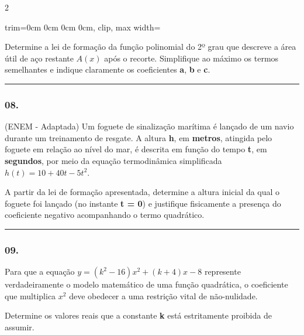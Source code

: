 \documentclass[twoside, 10pt, a4paper]{article}
\newlength{\espacoPreQuestao}
\newlength{\espacoQuestao}
\newlength{\larguraTikz}
\begin{document}
\begin{multicols*}{2}
\begin{center}
\begin{adjustbox}{trim=0cm 0cm 0cm 0cm, clip, max width=\larguraTikz}
\end{adjustbox}
\end{center}

Determine a lei de formação da função polinomial do 2º grau que descreve a área útil de aço restante $A(x)$ após o recorte. Simplifique ao máximo os termos semelhantes e indique claramente os coeficientes \textbf{a}, \textbf{b} e \textbf{c}.
\par\vspace{\espacoQuestao}

\noindent\textcolor{CorLinha}{\rule{\linewidth}{0.5pt}} 
\par\vspace{\espacoPreQuestao}
\subsubsection*{08.} (ENEM - Adaptada) Um foguete de sinalização marítima é lançado de um navio durante um treinamento de resgate. A altura \textbf{h}, em \textbf{metros}, atingida pelo foguete em relação ao nível do mar, é descrita em função do tempo \textbf{t}, em \textbf{segundos}, por meio da equação termodinâmica simplificada $h(t) = 10 + 40t - 5t^2$.

A partir da lei de formação apresentada, determine a altura inicial da qual o foguete foi lançado (no instante \textbf{t = 0}) e justifique fisicamente a presença do coeficiente negativo acompanhando o termo quadrático.
\par\vspace{\espacoQuestao}

\noindent\textcolor{CorLinha}{\rule{\linewidth}{0.5pt}} 
\par\vspace{\espacoPreQuestao}
\subsubsection*{09.} Para que a equação $y = (k^2 - 16)x^2 + (k + 4)x - 8$ represente verdadeiramente o modelo matemático de uma função quadrática, o coeficiente que multiplica $x^2$ deve obedecer a uma restrição vital de não-nulidade. 

Determine os valores reais que a constante \textbf{k} está estritamente proibida de assumir. 
\par\vspace{\espacoQuestao}


\end{multicols*}
\end{document}
